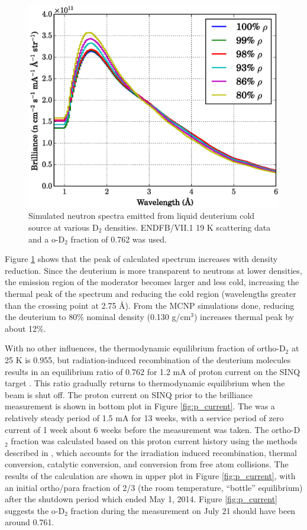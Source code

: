 \documentclass[5p,12pt]{elsarticle}
\begin{document}
\begin{figure}[h!] 
  \centering
    \includegraphics[width=\columnwidth]{graphics/density_compare.eps}
     \caption{Simulated neutron spectra emitted from liquid deuterium cold source at various D$_2$ densities. ENDFB/VII.1 19 K scattering data and a o-D$_2$ fraction of 0.762 was used.   \label{fig:density_compare}}
\end{figure}

Figure \ref{fig:density_compare} shows that the peak of calculated spectrum increases with density reduction.  Since the deuterium is more transparent to neutrons at lower densities, the emission region of the moderator becomes larger and less cold, increasing the thermal peak of the spectrum and reducing the cold region (wavelengths greater than the crossing point at 2.75 {\AA}).  From the MCNP simulations done, reducing the deuterium to 80\% nominal density (0.130 g/cm$^3$) increases thermal peak by about 12\%.

With no other influences, the thermodynamic equilibrium fraction of ortho-D$_2$ at 25 K is 0.955, but radiation-induced recombination of the deuterium molecules results in an equilibrium ratio of 0.762 for 1.2 mA of proton current on the SINQ target \cite{op_equi}.  This ratio gradually returns to thermodynamic equilibrium when the beam is shut off.  The proton current on SINQ prior to the brilliance measurement is shown in bottom plot in Figure \ref{fig:p_current}.  The was a relatively steady period of 1.5 mA for 13 weeks, with a service period of zero current of 1 week about 6 weeks before the measurement was taken.  The ortho-D$_2$ fraction was calculated based on this proton current history using the methods described in \cite{op_equi}, which accounts for the irradiation induced recombination, thermal conversion, catalytic conversion, and conversion from free atom collisions.  The results of the calculation are shown in upper plot in Figure \ref{fig:p_current}, with an initial ortho/para fraction of 2/3 (the room temperature, ``bottle'' equilibrium) after the shutdown period which ended May 1, 2014.  Figure \ref{fig:p_current} suggests the o-D$_2$ fraction during the measurement on July 21 should have been around 0.761.
\end{document}
